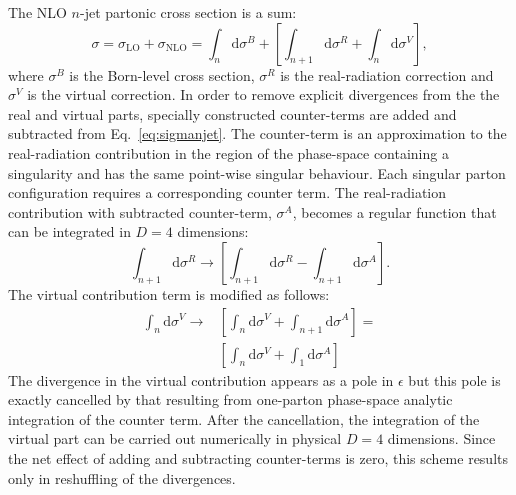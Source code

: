 The NLO $n$-jet partonic cross section is a sum:
\begin{equation}
\sigma = \sigma_\text{LO} + \sigma_\text{NLO} = \int_n{\mathrm{d}\sigma^B} + \left[ \int_{n+1}{\mathrm{d}\sigma^R} + \int_n{\mathrm{d}\sigma^V} \right],
\label{eq:sigmanjet}
\end{equation}
where $\sigma^B$ is the Born-level cross section, $\sigma^R$ is the real-radiation correction and $\sigma^V$ is the virtual correction. In order to remove explicit divergences from the the real and virtual parts, specially constructed counter-terms are added and subtracted from Eq.~\ref{eq:sigmanjet}. The counter-term is an approximation to the real-radiation contribution in the region of the phase-space containing a singularity and has the same point-wise singular behaviour. Each singular parton configuration requires a corresponding counter term. The real-radiation contribution with subtracted counter-term, $\sigma^A$, becomes a regular function that can be integrated in $D=4$ dimensions:
\begin{equation}
\int_{n+1}{\mathrm{d}\sigma^R} \rightarrow \left[ \int_{n+1}{\mathrm{d}\sigma^R} - \int_{n+1}{\mathrm{d}\sigma^A} \right].
\end{equation}
The virtual contribution term is modified as follows:
\begin{equation}
	\begin{split}
		\int_{n}{\mathrm{d}\sigma^V} \rightarrow& \left[ \int_{n}{\mathrm{d}\sigma^V} + \int_{n+1}{\mathrm{d}\sigma^A} \right] = \\
                                                      & \left[ \int_{n}{\mathrm{d}\sigma^V + \int_{1}{\mathrm{d}\sigma^A}} \right]
	\end{split}
\end{equation}
The divergence in the virtual contribution appears as a pole in $\epsilon$ but this pole is exactly cancelled by that resulting from one-parton phase-space analytic integration of the counter term. After the cancellation, the integration of the virtual part can be carried out numerically in physical $D=4$ dimensions. Since the net effect of adding and subtracting counter-terms is zero, this scheme results only in reshuffling of the divergences.
